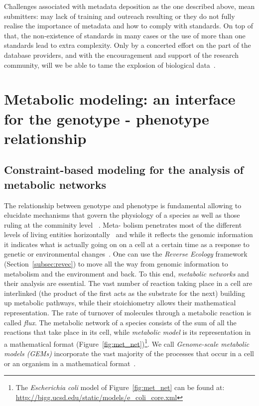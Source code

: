       Challenges associated with metadata deposition 
      as the one described above,
      mean submitters: 
      may lack of training and outreach resulting 
      or they do not fully realise the importance of metadata and 
      how to comply with standards.
      On top of that, the non-existence of standards in many cases 
      or the use of more than one standards lead to extra complexity.
      Only by a concerted effort on the part of the database providers, and with the encouragement and support of the research community, will we be able to tame the explosion of biological data~\cite{stein2003integrating}.
\section{Metabolic modeling: an interface for the genotype - phenotype relationship}


   \subsection{Constraint-based modeling for the analysis of metabolic networks}
   \label{subesec:modling}

      The relationship between genotype and phenotype is fundamental allowing to elucidate 
      mechanisms that govern the physiology of a species as well as those 
      ruling at the comminity level
      ~\cite{morris2020linking}.
      Meta-
      bolism penetrates most of the different levels of living entities horizontally~\cite{schramski2015metabolic} and 
      while it reflects the genomic information it indicates 
      what is actually going on on a cell at a certain time
      as a response to genetic or environmental changes~\cite{lima2021role}.
      One can use the \textit{Reverse Ecology} framework (Section~\ref{subsec:revec})
      to move all the way from genomic information to metabolism and the environment and back.
      To this end, \textit{metabolic networks} and their analysis are essential. 
      The vast number of reaction taking place in a cell are interlinked 
      (the product of the first acts as the substrate for the next) 
      building up metabolic pathways,
      while their stoichiometry allows their mathematical representation. 
      The rate of turnover of molecules through a metabolic reaction is called \textit{flux}.
      The metabolic network of a species consists of the sum of all the reactions that 
      take place in its cell,
      while \textit{metabolic model} is its representation in a mathematical format (Figure~\ref{fig:met_net})\footnote{               
         The \textit{Escherichia coli} model of Figure~\ref{fig:met_net} can be found at:\\
            \href{http://bigg.ucsd.edu/static/models/e_coli_core.xml}{http://bigg.ucsd.edu/static/models/e\_coli\_core.xml}
      }. 
      We call \textit{Genome-scale metabolic models (GEMs)} incorporate the vast majority of the 
      processes that occur in a cell or an organism in a mathematical format~\cite{feist2009reconstruction}.



